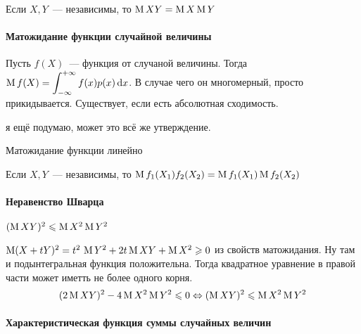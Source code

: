 \documentclass[12pt,timbord]{../../../notes}
\begin{document}
\begin{prop}\label{prop:stat::randsum::expmul}
  Если $X,Y$~--- независимы, то $\operatorname{M} XY = \operatorname{M} X \operatorname{M} Y$
\end{prop}
%

\paragraph{Матожидание функции случайной величины}
\label{par:stat::expfun}

\begin{defn}[$\ddot\sim$]\label{defn:stat::expfun::expfun}
  Пусть $f(X)$~--- функция от случаной величины. Тогда 
  $\displaystyle \operatorname{M} f(X) = \int_{-\infty}^{+\infty} f(x) p(x)\, \mathrm{d} x$. В случае чего он многомерный, просто
  прикидывается. Существует, если есть абсолютная сходимость.
\end{defn}
\begin{rem*}
  я ещё подумаю, может это всё же утверждение.
\end{rem*}
\begin{prop}\label{prop:stat::expfun::lin}
  Матожидание функции линейно
\end{prop}
\begin{prop}\label{prop:stat::expfun::mul}
  Если $X,Y$~--- независимы, то $\operatorname{M} f_1(X_1)f_2(X_2) = \operatorname{M} f_1(X_1) \operatorname{M} f_2(X_2)$
\end{prop}


\paragraph{Неравенство Шварца}
\label{par:stat::shwartz}

\begin{prop}\label{prop:stat::shwartz}
  $(\operatorname{M}  XY)^2 \leqslant \operatorname{M} X^2 \operatorname{M} Y^2$
\end{prop}
\begin{itlproof}
  $\operatorname{M} (X+ tY)^2 = t^2\,\operatorname{M} Y^2 + 2 t \operatorname{M} XY + \operatorname{M} X^2 \geqslant 0$ из свойств матожидания. Ну
  там и подынтегральная функция положительна. Тогда квадратное уравнение в правой части может
  иметть не более одного корня.
  \[
    (2 \operatorname{M} XY)^2 - 4 \operatorname{M} X^2 \operatorname{M} Y^2 \leqslant 0 \Leftrightarrow 
    (\operatorname{M}  XY)^2 \leqslant \operatorname{M} X^2 \operatorname{M} Y^2
  \]
\end{itlproof}

\paragraph{Характеристическая функция суммы случайных величин}
\label{par:stat::charfunsum}
\end{document}
